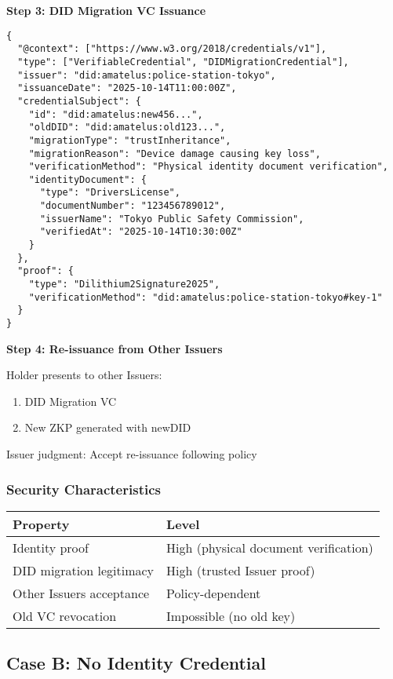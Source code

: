 \textbf{Step 3: DID Migration VC Issuance}

\begin{verbatim}
{
  "@context": ["https://www.w3.org/2018/credentials/v1"],
  "type": ["VerifiableCredential", "DIDMigrationCredential"],
  "issuer": "did:amatelus:police-station-tokyo",
  "issuanceDate": "2025-10-14T11:00:00Z",
  "credentialSubject": {
    "id": "did:amatelus:new456...",
    "oldDID": "did:amatelus:old123...",
    "migrationType": "trustInheritance",
    "migrationReason": "Device damage causing key loss",
    "verificationMethod": "Physical identity document verification",
    "identityDocument": {
      "type": "DriversLicense",
      "documentNumber": "123456789012",
      "issuerName": "Tokyo Public Safety Commission",
      "verifiedAt": "2025-10-14T10:30:00Z"
    }
  },
  "proof": {
    "type": "Dilithium2Signature2025",
    "verificationMethod": "did:amatelus:police-station-tokyo#key-1"
  }
}
\end{verbatim}

\textbf{Step 4: Re-issuance from Other Issuers}

Holder presents to other Issuers:
\begin{enumerate}
  \item DID Migration VC
  \item New ZKP generated with newDID
\end{enumerate}

Issuer judgment: Accept re-issuance following policy

\subsubsection{Security Characteristics}

\begin{table}[h]
\centering
\begin{tabular}{|l|l|}
\hline
\textbf{Property} & \textbf{Level} \\
\hline
Identity proof & High (physical document verification) \\
DID migration legitimacy & High (trusted Issuer proof) \\
Other Issuers acceptance & Policy-dependent \\
Old VC revocation & Impossible (no old key) \\
\hline
\end{tabular}
\end{table}

\subsection{Case B: No Identity Credential}

